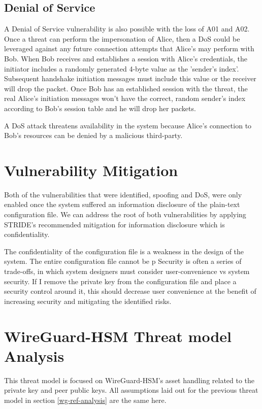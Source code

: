\documentclass [11pt, proquest] {uwthesis}[2020/02/24]
\begin{document}
\subsection{Denial of Service}
\label{dos}
A Denial of Service vulnerability is also possible with the loss of A01 and A02. Once a threat can perform the impersonation of Alice, then a DoS could be leveraged against any future connection attempts that Alice's may perform with Bob. When Bob receives and establishes a session with Alice's credentials, the initiator includes a randomly generated 4-byte value as the 'sender's index'. Subsequent handshake initiation messages must include this value or the receiver will drop the packet. Once Bob has an established session with the threat, the real Alice's initiation messages won't have the correct, random sender's index according to Bob's session table and he will drop her packets.

A DoS attack threatens availability in the system because Alice's connection to Bob's resources can be denied by a malicious third-party.



\section{Vulnerability Mitigation}
\label{vulns}
Both of the vulnerabilities that were identified, spoofing and DoS, were only enabled once the system suffered an information disclosure of the plain-text configuration file. We can address the root of both vulnerabilities by applying STRIDE's recommended mitigation for information disclosure which is confidentiality. 

The confidentiality of the configuration file is a weakness in the design of the system. The entire configuration file cannot be p
Security is often a series of trade-offs, in which system designers must consider user-convenience vs system security. If I remove the private key from the configuration file and place a security control around it, this should decrease user convenience at the benefit of increasing security and mitigating the identified risks.

\section{WireGuard-HSM Threat model Analysis}
\label{wg-hsm-analysis}
This threat model is focused on WireGuard-HSM's asset handling related to the private key and peer public keys. All assumptions laid out for the previous threat model in section \ref{wg-ref-analysis} are the same here.
\end{document}
